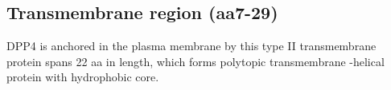 \subsection{Transmembrane region (aa7-29)}


DPP4 is anchored in the plasma membrane by this type II transmembrane protein spans 22 aa in length, which forms polytopic transmembrane \alpha-helical protein with hydrophobic core.~\cite{Hong_1990}
